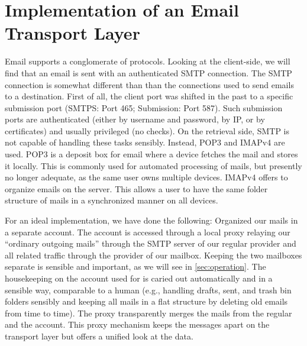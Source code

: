 \section{Implementation of an Email Transport Layer}
Email supports a conglomerate of protocols. Looking at the client-side, we will find that an email is sent with an authenticated SMTP connection. The SMTP connection is somewhat different than than the connections used to send emails to a destination. First of all, the client port was shifted in the past to a specific submission port (SMTPS: Port 465; Submission: Port 587). Such submission ports are authenticated (either by username and password, by IP, or by certificates) and usually privileged (no  checks). On the retrieval side, SMTP is not capable of handling these tasks sensibly. Instead, POP3 and IMAPv4 are used. POP3 is a deposit box for email where a device fetches the mail and stores it locally. This is commonly used for automated processing of mails, but presently no longer adequate, as the same user owns multiple devices. IMAPv4 offers to organize emails on the server. This allows a user to have the same folder structure of mails in a synchronized manner on all devices.

For an ideal implementation, we have done the following: Organized our \MessageVortex{} mails in a separate account. The account is accessed through a local proxy relaying our ``ordinary outgoing mails'' through the SMTP server of our regular provider and all \MessageVortex{} related traffic through the provider of our \MessageVortex{} mailbox. Keeping the two mailboxes separate is sensible and important, as we will see in \cref{sec:operation}. The housekeeping on the account used for \MessageVortex{} is caried out automatically and in a sensible way, comparable to a human (e.g., handling drafts, sent, and trash bin folders sensibly and keeping all mails in a flat structure by deleting old emails from time to time). The proxy transparently merges the mails from the regular and the \MessageVortex{} account. This proxy mechanism keeps the messages apart on the transport layer but offers a unified look at the data.

